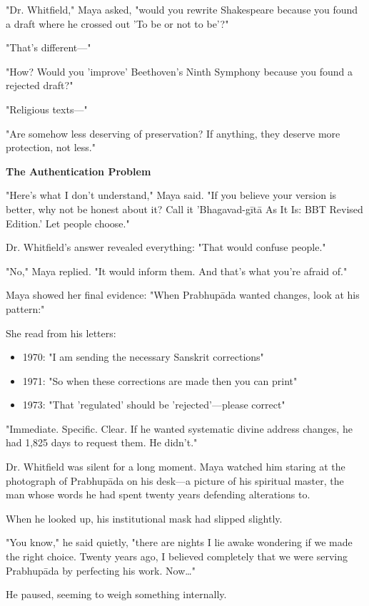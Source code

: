 \documentclass[12pt,twoside]{book}
\begin{document}
"Dr. Whitfield," Maya asked, "would you rewrite Shakespeare because you found a draft where he crossed out 'To be or not to be'?"

"That's different—"

"How? Would you 'improve' Beethoven's Ninth Symphony because you found a rejected draft?"

"Religious texts—"

"Are somehow less deserving of preservation? If anything, they deserve more protection, not less."

\textbf{\textbf{\textbf{The Authentication Problem}}}

"Here's what I don't understand," Maya said. "If you believe your version is better, why not be honest about it? Call it 'Bhagavad-gītā As It Is: BBT Revised Edition.' Let people choose."

Dr. Whitfield's answer revealed everything: "That would confuse people."

"No," Maya replied. "It would inform them. And that's what you're afraid of."

Maya showed her final evidence: "When Prabhupāda wanted changes, look at his pattern:"

She read from his letters:
\begin{itemize}
\item 1970: "I am sending the necessary Sanskrit corrections"
\item 1971: "So when these corrections are made then you can print"
\item 1973: "That 'regulated' should be 'rejected'—please correct"
\end{itemize}

"Immediate. Specific. Clear. If he wanted systematic divine address changes, he had 1,825 days to request them. He didn't."

Dr. Whitfield was silent for a long moment. Maya watched him staring at the photograph of Prabhupāda on his desk—a picture of his spiritual master, the man whose words he had spent twenty years defending alterations to.

When he looked up, his institutional mask had slipped slightly. 

"You know," he said quietly, "there are nights I lie awake wondering if we made the right choice. Twenty years ago, I believed completely that we were serving Prabhupāda by perfecting his work. Now\ldots{}"

He paused, seeming to weigh something internally.
\end{document}
